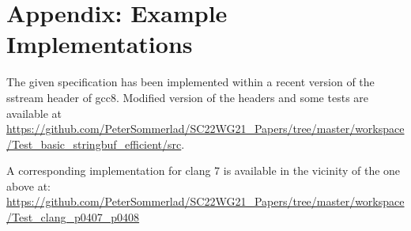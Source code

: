 \documentclass[ebook,11pt,article]{memoir}
\begin{document}
\chapter{Appendix: Example Implementations}

The given specification has been implemented within a recent version of the sstream header of gcc8. Modified version of the headers and some tests are available at
\url{https://github.com/PeterSommerlad/SC22WG21_Papers/tree/master/workspace/Test_basic_stringbuf_efficient/src}.

A corresponding implementation for clang 7 is available in the vicinity of the one above at:
\url{https://github.com/PeterSommerlad/SC22WG21_Papers/tree/master/workspace/Test_clang_p0407_p0408}
\end{document}
